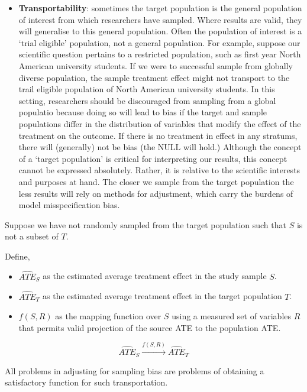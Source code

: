 \documentclass[
  single column]{article}
\providecommand{\tightlist}{%
  \setlength{\itemsep}{0pt}\setlength{\parskip}{0pt}}\usepackage{longtable,booktabs,array}
\begin{document}
\begin{itemize}
\tightlist
\item
  \textbf{Transportability}: sometimes the target population is the
  general population of interest from which researchers have sampled.
  Where results are valid, they will generalise to this general
  population. Often the population of interest is a `trial eligible'
  population, not a general population. For example, suppose our
  scientific question pertains to a restricted population, such as first
  year North American university students. If we were to successful
  sample from globally diverse population, the sample treatment effect
  might not transport to the trail eligible population of North American
  university students. In this setting, researchers should be
  discouraged from sampling from a global populatio because doing so
  will lead to bias if the target and sample populations differ in the
  distribution of variables that modify the effect of the treatment on
  the outcome. If there is no treatment in effect in any stratums, there
  will (generally) not be bias (the NULL will hold.) Although the
  concept of a `target population' is critical for interpreting our
  results, this concept cannot be expressed absolutely. Rather, it is
  relative to the scientific interests and purposes at hand. The closer
  we sample from the target population the less results will rely on
  methods for adjustment, which carry the burdens of model
  misspecification bias.
\end{itemize}

Suppose we have not randomly sampled from the target population such
that \(S\) is not a subset of \(T\).

Define,

\begin{itemize}
\tightlist
\item
  \(\hat{ATE}_{S}\) as the estimated average treatment effect in the
  study sample \(S\).
\item
  \(\hat{ATE}_{T}\) as the estimated average treatment effect in the
  target population \(T\).
\item
  \(f(S, R)\) as the mapping function over \(S\) using a measured set of
  variables \(R\) that permits valid projection of the source ATE to the
  population ATE.
\end{itemize}

\[
\hat{ATE}_{S} \xrightarrow{f(S, R)} \hat{ATE}_{T}
\]

All problems in adjusting for sampling bias are problems of obtaining a
satisfactory function for such transportation.
\end{document}
